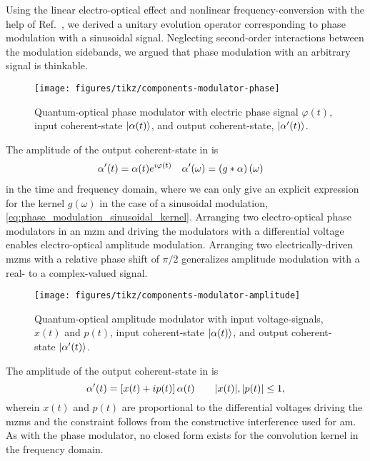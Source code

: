 Using the linear electro-optical effect and nonlinear frequency-conversion with the help of Ref.~\cite{Horoshko2018,QuesadaMejia2015}, we derived a unitary evolution operator corresponding to phase modulation with a sinusoidal signal.
Neglecting second-order interactions between the modulation sidebands, we argued that phase modulation with an arbitrary signal is thinkable.
\begin{figure}[htb]
    \centering
    \texttt{[image: figures/tikz/components-modulator-phase]}
    \caption{Quantum-optical phase modulator with electric phase signal $\varphi(t)$, input coherent-state $\lvert\alpha(t)\rangle$, and output coherent-state, $\lvert\alpha^\prime(t)\rangle$.}\label{fig:components_modulator_phase}
\end{figure}
The amplitude of the output coherent-state in  is
\begin{align}
	\alpha^\prime(t)
	&=
	\alpha(t)
	e^{i\varphi(t)}
	&
	\alpha^\prime(\omega)
	&=
	\left(g\ast\alpha\right)(\omega)
\end{align}
in the time and frequency domain, where we can only give an explicit expression for the kernel $g(\omega)$ in the case of a sinusoidal modulation, \cref{eq:phase_modulation_sinusoidal_kernel}.
Arranging two electro-optical phase modulators in an \gls{mzm} and driving the modulators with a differential voltage enables electro-optical amplitude modulation.
Arranging two electrically-driven \glspl{mzm} with a relative phase shift of $\pi/2$ generalizes amplitude modulation with a real- to a complex-valued signal.
\begin{figure}[htb]
    \centering
    \texttt{[image: figures/tikz/components-modulator-amplitude]}
    \caption{Quantum-optical amplitude modulator with input voltage-signals, $x(t)$ and $p(t)$, input coherent-state $\lvert\alpha(t)\rangle$, and output coherent-state $\lvert\alpha^\prime(t)\rangle$.}\label{fig:components_modulator_phase}
\end{figure}
The amplitude of the output coherent-state in  is
\begin{equation}
	\alpha^\prime(t)
	=
	\left[
		x(t)
		+
		ip(t)
	\right]
	\alpha(t)
	\qquad
	\lvert x(t)\rvert,
	\lvert p(t)\rvert
	\leq
	1
	,
\end{equation}
wherein $x(t)$ and $p(t)$ are proportional to the differential voltages driving the \glspl{mzm} and the constraint follows from the constructive interference used for \gls{am}.
As with the phase modulator, no closed form exists for the convolution kernel in the frequency domain.

